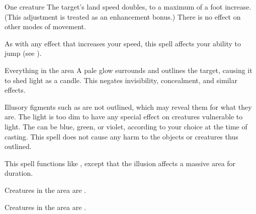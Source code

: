 \spellrng{\rngclose}
\spelldur{\durshort \dismissable}
\begin{spelltarget}{One creature}
    \spelleffect The target's land speed doubles, to a maximum of a  foot increase. (This adjustment is treated as an enhancement bonus.) There is no effect on other modes of movement.
\end{spelltarget}
\spellnotes As with any effect that increases your speed, this spell affects your ability to jump (see ).

\begin{comment}
\subsubsection{F}
\end{comment}

\spelldur{\durshort \dismissable}
\begin{spelltarget}{Everything in the area}
    \spelleffect A pale glow surrounds and outlines the target, causing it to shed light as a candle. This negates invisibility, concealment, and similar effects.
\end{spelltarget}
\spellnotes Illusory figments such as  are not outlined, which may reveal them for what they are. The light is too dim to have any special effect on creatures vulnerable to light. The  can be blue, green, or violet, according to your choice at the time of casting. This spell does not cause any harm to the objects or creatures thus outlined.

\spelldur{\durlong \dismissable}
\spelleffect This spell functions like , except that the illusion affects a massive area for \durlong duration.

\spelldur{\durshort \dismissable}
\begin{spellhealthy}
    Creatures in the area are \shaken.
\end{spellhealthy}
\begin{spellblood}
    Creatures in the area are \frightened.
\end{spellblood}

